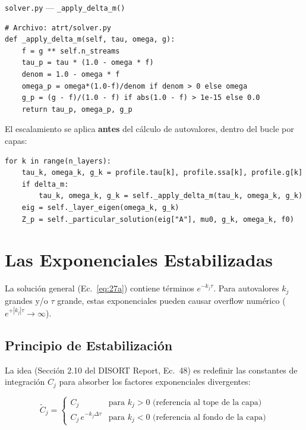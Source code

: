 \documentclass[a4paper,11pt]{article}
\begin{document}
\begin{implementation}{\texttt{solver.py} --- \texttt{\_apply\_delta\_m()}}
\begin{lstlisting}
# Archivo: atrt/solver.py
def _apply_delta_m(self, tau, omega, g):
    f = g ** self.n_streams
    tau_p = tau * (1.0 - omega * f)
    denom = 1.0 - omega * f
    omega_p = omega*(1.0-f)/denom if denom > 0 else omega
    g_p = (g - f)/(1.0 - f) if abs(1.0 - f) > 1e-15 else 0.0
    return tau_p, omega_p, g_p
\end{lstlisting}
El escalamiento se aplica \textbf{antes} del c\'alculo de autovalores, dentro del bucle por capas:
\begin{lstlisting}
for k in range(n_layers):
    tau_k, omega_k, g_k = profile.tau[k], profile.ssa[k], profile.g[k]
    if delta_m:
        tau_k, omega_k, g_k = self._apply_delta_m(tau_k, omega_k, g_k)
    eig = self._layer_eigen(omega_k, g_k)
    Z_p = self._particular_solution(eig["A"], mu0, g_k, omega_k, f0)
\end{lstlisting}
\end{implementation}

\section{Las Exponenciales Estabilizadas}
\label{sec:stable_exp}

La soluci\'on general (Ec.~\ref{eq:27a}) contiene t\'erminos $e^{-k_j \tau}$.  Para autovalores $k_j$ grandes y/o $\tau$ grande, estas exponenciales pueden causar overflow num\'erico ($e^{+|k_j|\tau} \to \infty$).

\subsection{Principio de Estabilizaci\'on}

La idea (Secci\'on 2.10 del DISORT Report, Ec.\ 48) es redefinir las constantes de integraci\'on $C_j$ para absorber los factores exponenciales divergentes:

\begin{equation}
\widetilde{C}_j = \begin{cases}
C_j & \text{para } k_j > 0 \text{ (referencia al tope de la capa)} \\
C_j \, e^{-k_j \Delta\tau} & \text{para } k_j < 0 \text{ (referencia al fondo de la capa)}
\end{cases}
\end{equation}
\end{document}
